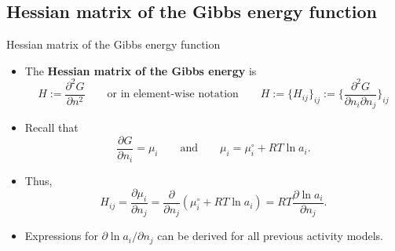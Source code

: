 \subsection{Hessian matrix of the Gibbs energy function}
%
\begin{frame}{Hessian matrix of the Gibbs energy function}
\begin{itemize}
\item The \alert{\bf Hessian matrix of the Gibbs energy} is
\[
H :=\frac{\partial^{2}G}{\partial n^{2}} 
\qquad\text{or in element-wise notation}\qquad 
H :=\big\{ H_{ij} \big\}_{ij} 
:= \Bigg\{ \frac{\partial^{2}G}{\partial n_{i}\partial n_{j}}\Bigg\}_{ij} 
\]
\item Recall that
\[
\frac{\partial G}{\partial n_{i}}=\mu_{i}\qquad\text{and}\qquad\mu_{i}=\mu_{i}^{\circ}+RT\ln a_{i}.
\]
\item Thus, 
\[
H_{ij}=\frac{\partial\mu_{i}}{\partial n_{j}}=\frac{\partial}{\partial n_{j}}\left(\mu_{i}^{\circ}+RT\ln a_{i}\right)=RT\frac{\partial\ln a_{i}}{\partial n_{j}}.
\]
\item Expressions for $\partial\ln a_{i}/\partial n_{j}$ can be derived
for all previous activity models.
\end{itemize}
\end{frame}
%
